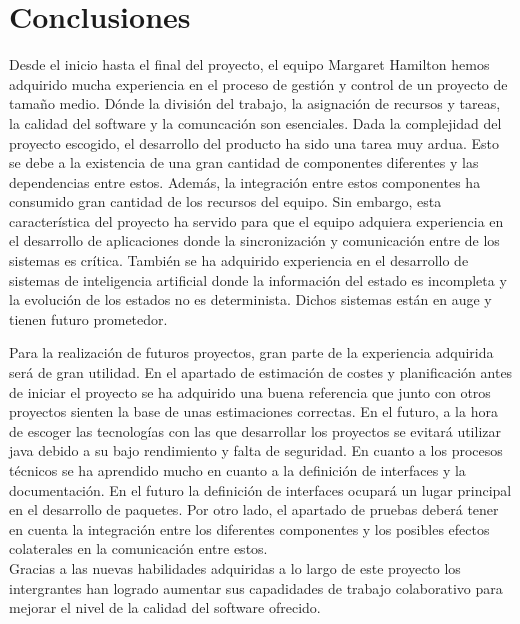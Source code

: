 \section{Conclusiones}
\label{conclusiones}

Desde el inicio hasta el final del proyecto, el equipo Margaret Hamilton hemos adquirido mucha experiencia en el proceso de gestión y control de un proyecto de tamaño medio. Dónde la división del trabajo, la asignación de recursos y tareas, la calidad del software y la comuncación son esenciales. Dada la complejidad del proyecto escogido, el desarrollo del producto ha sido una tarea muy ardua. Esto se debe a la existencia de una gran cantidad de componentes diferentes y las dependencias entre estos. Además, la integración entre estos componentes ha consumido gran cantidad de los recursos del equipo. Sin embargo, esta característica del proyecto ha servido para que el equipo adquiera experiencia en el desarrollo de aplicaciones donde la sincronización y comunicación entre de los sistemas es crítica. También se ha adquirido experiencia en el desarrollo de sistemas de inteligencia artificial donde la información del estado es incompleta y la evolución de los estados no es determinista. Dichos sistemas están en auge y tienen futuro prometedor.

Para la realización de futuros proyectos, gran parte de la experiencia adquirida será de gran utilidad. En el apartado de estimación de costes y planificación antes de iniciar el proyecto se ha adquirido una buena referencia que junto con otros proyectos sienten la base de unas estimaciones correctas. En el futuro, a la hora de escoger las tecnologías con las que desarrollar los proyectos se evitará utilizar java debido a su bajo rendimiento y falta de seguridad. En cuanto a los procesos técnicos se ha aprendido mucho en cuanto a la definición de interfaces y la documentación. En el futuro la definición de interfaces ocupará un lugar principal en el desarrollo de paquetes. Por otro lado, el apartado de pruebas deberá tener en cuenta la integración entre los diferentes componentes y los posibles efectos colaterales en la comunicación entre estos.
\\
Gracias a las nuevas habilidades adquiridas a lo largo de este proyecto los intergrantes han logrado aumentar sus capadidades de trabajo colaborativo para mejorar el nivel de la calidad del software ofrecido.